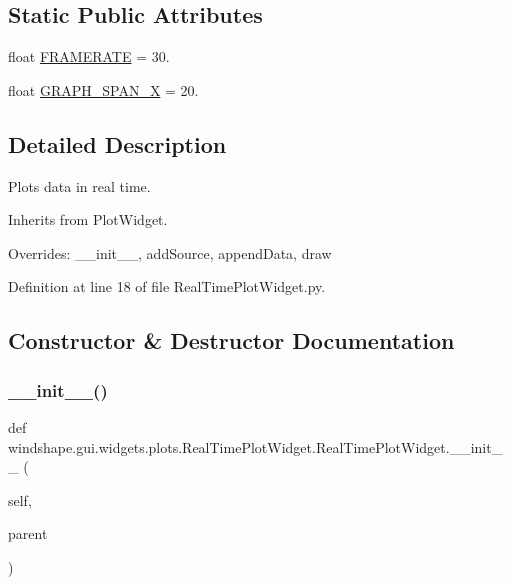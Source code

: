 \subsection*{Static Public Attributes}
\begin{DoxyCompactItemize}
\item 
float \mbox{\hyperlink{classwindshape_1_1gui_1_1widgets_1_1plots_1_1_real_time_plot_widget_1_1_real_time_plot_widget_a82d2b81174b4975b9396ac654faea965}{F\+R\+A\+M\+E\+R\+A\+TE}} = 30.
\item 
float \mbox{\hyperlink{classwindshape_1_1gui_1_1widgets_1_1plots_1_1_real_time_plot_widget_1_1_real_time_plot_widget_acd38dd5df1d271bec1821d5d37ea9141}{G\+R\+A\+P\+H\+\_\+\+S\+P\+A\+N\+\_\+X}} = 20.
\end{DoxyCompactItemize}


\subsection{Detailed Description}
\begin{DoxyVerb}Plots data in real time.

Inherits from PlotWidget.

Overrides: __init__, addSource, appendData, draw
\end{DoxyVerb}
 

Definition at line 18 of file Real\+Time\+Plot\+Widget.\+py.



\subsection{Constructor \& Destructor Documentation}
\mbox{\label{classwindshape_1_1gui_1_1widgets_1_1plots_1_1_real_time_plot_widget_1_1_real_time_plot_widget_a2709f2b7482161f7d965ea04c8e0ba6d}} 
\subsubsection{\texorpdfstring{\+\_\+\+\_\+init\+\_\+\+\_\+()}{\_\_init\_\_()}}
{\footnotesize\ttfamily def windshape.\+gui.\+widgets.\+plots.\+Real\+Time\+Plot\+Widget.\+Real\+Time\+Plot\+Widget.\+\_\+\+\_\+init\+\_\+\+\_\+ (\begin{DoxyParamCaption}\item[{}]{self,  }\item[{}]{parent }\end{DoxyParamCaption})}

